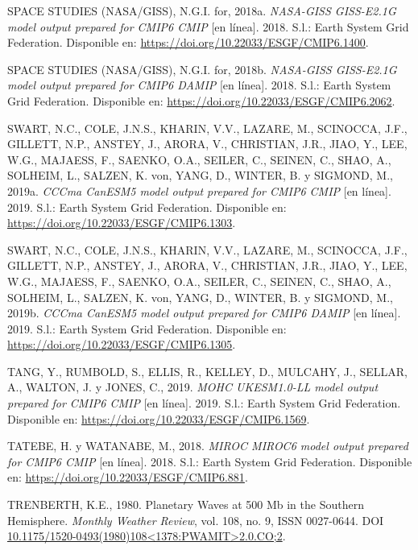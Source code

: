 \documentclass[12pt,oneside,a4paper]{reedthesis}
\newlength{\cslhangindent}
\newenvironment{CSLReferences}[2] %
 {%
  \setlength{\parindent}{0pt}
  \ifodd #1 \everypar{\setlength{\hangindent}{\cslhangindent}}\ignorespaces\fi
  \ifnum #2 > 0
  \setlength{\parskip}{#2\baselineskip}
  \fi
 }%
 {}
\begin{document}
\begin{CSLReferences}{1}{0}
\leavevmode{}%
SPACE STUDIES (NASA/GISS), N.G.I. for, 2018a. \emph{NASA-GISS GISS-E2.1G model output prepared for CMIP6 CMIP} {[}en línea{]}. 2018. S.l.: Earth System Grid Federation. Disponible en: \url{https://doi.org/10.22033/ESGF/CMIP6.1400}.

\leavevmode{}%
SPACE STUDIES (NASA/GISS), N.G.I. for, 2018b. \emph{NASA-GISS GISS-E2.1G model output prepared for CMIP6 DAMIP} {[}en línea{]}. 2018. S.l.: Earth System Grid Federation. Disponible en: \url{https://doi.org/10.22033/ESGF/CMIP6.2062}.

\leavevmode{}%
SWART, N.C., COLE, J.N.S., KHARIN, V.V., LAZARE, M., SCINOCCA, J.F., GILLETT, N.P., ANSTEY, J., ARORA, V., CHRISTIAN, J.R., JIAO, Y., LEE, W.G., MAJAESS, F., SAENKO, O.A., SEILER, C., SEINEN, C., SHAO, A., SOLHEIM, L., SALZEN, K. von, YANG, D., WINTER, B. y SIGMOND, M., 2019a. \emph{CCCma CanESM5 model output prepared for CMIP6 CMIP} {[}en línea{]}. 2019. S.l.: Earth System Grid Federation. Disponible en: \url{https://doi.org/10.22033/ESGF/CMIP6.1303}.

\leavevmode{}%
SWART, N.C., COLE, J.N.S., KHARIN, V.V., LAZARE, M., SCINOCCA, J.F., GILLETT, N.P., ANSTEY, J., ARORA, V., CHRISTIAN, J.R., JIAO, Y., LEE, W.G., MAJAESS, F., SAENKO, O.A., SEILER, C., SEINEN, C., SHAO, A., SOLHEIM, L., SALZEN, K. von, YANG, D., WINTER, B. y SIGMOND, M., 2019b. \emph{CCCma CanESM5 model output prepared for CMIP6 DAMIP} {[}en línea{]}. 2019. S.l.: Earth System Grid Federation. Disponible en: \url{https://doi.org/10.22033/ESGF/CMIP6.1305}.

\leavevmode{}%
TANG, Y., RUMBOLD, S., ELLIS, R., KELLEY, D., MULCAHY, J., SELLAR, A., WALTON, J. y JONES, C., 2019. \emph{MOHC UKESM1.0-LL model output prepared for CMIP6 CMIP} {[}en línea{]}. 2019. S.l.: Earth System Grid Federation. Disponible en: \url{https://doi.org/10.22033/ESGF/CMIP6.1569}.

\leavevmode{}%
TATEBE, H. y WATANABE, M., 2018. \emph{MIROC MIROC6 model output prepared for CMIP6 CMIP} {[}en línea{]}. 2018. S.l.: Earth System Grid Federation. Disponible en: \url{https://doi.org/10.22033/ESGF/CMIP6.881}.

\leavevmode{}%
TRENBERTH, K.E., 1980. Planetary {Waves} at 500 Mb in the {Southern Hemisphere}. \emph{Monthly Weather Review}, vol. 108, no. 9, ISSN 0027-0644. DOI \href{https://doi.org/10.1175/1520-0493(1980)108\%3C1378:PWAMIT\%3E2.0.CO;2}{10.1175/1520-0493(1980)108\textless1378:PWAMIT\textgreater2.0.CO;2}.


\end{CSLReferences}
\end{document}
